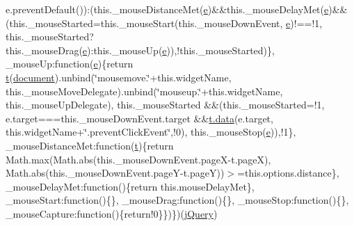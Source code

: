 \begin{DoxyCompactItemize}
e.\-prevent\-Default())\-:(this.\-\_\-mouse\-Distance\-Met(\hyperlink{static_2root_2js_2jquery-ui_8custom_8min_8js_abea95a4e94bc6f4151d5683d4c12c3f4}{e})\&\&this.\-\_\-mouse\-Delay\-Met(\hyperlink{static_2root_2js_2jquery-ui_8custom_8min_8js_abea95a4e94bc6f4151d5683d4c12c3f4}{e})\&\&(this.\-\_\-mouse\-Started=this.\-\_\-mouse\-Start(this.\-\_\-mouse\-Down\-Event, \hyperlink{static_2root_2js_2jquery-ui_8custom_8min_8js_abea95a4e94bc6f4151d5683d4c12c3f4}{e})!==!1, this.\-\_\-mouse\-Started?this.\-\_\-mouse\-Drag(\hyperlink{static_2root_2js_2jquery-ui_8custom_8min_8js_abea95a4e94bc6f4151d5683d4c12c3f4}{e})\-:this.\-\_\-mouse\-Up(\hyperlink{static_2root_2js_2jquery-ui_8custom_8min_8js_abea95a4e94bc6f4151d5683d4c12c3f4}{e})),!this.\-\_\-mouse\-Started)\}, \-\_\-mouse\-Up\-:function(\hyperlink{static_2root_2js_2jquery-ui_8custom_8min_8js_abea95a4e94bc6f4151d5683d4c12c3f4}{e})\{return \hyperlink{static_2root_2js_2bootstrap_2jquery-ui-1_810_84_8custom_8min_8js_acf335ef347969ef6dc8387e680fb289e}{t}(\hyperlink{static_2root_2js_2headroom_8min_8js_aa14f8e0338cced6720590fd2ea13bd4b}{document}).unbind(\char`\"{}mousemove.\char`\"{}+this.\-widget\-Name, this.\-\_\-mouse\-Move\-Delegate).unbind(\char`\"{}mouseup.\char`\"{}+this.\-widget\-Name, this.\-\_\-mouse\-Up\-Delegate), this.\-\_\-mouse\-Started \&\&(this.\-\_\-mouse\-Started=!1, e.\-target===this.\-\_\-mouse\-Down\-Event.\-target \&\&\hyperlink{jquery-migrate-1_82_81_8min_8js_a7f60fda3d1d4191e549df075eeacf25b}{t.\-data}(e.\-target, this.\-widget\-Name+\char`\"{}.prevent\-Click\-Event\char`\"{},!0), this.\-\_\-mouse\-Stop(\hyperlink{static_2root_2js_2jquery-ui_8custom_8min_8js_abea95a4e94bc6f4151d5683d4c12c3f4}{e})),!1\}, \-\_\-mouse\-Distance\-Met\-:function(\hyperlink{static_2root_2js_2bootstrap_2jquery-ui-1_810_84_8custom_8min_8js_acf335ef347969ef6dc8387e680fb289e}{t})\{return Math.\-max(Math.\-abs(this.\-\_\-mouse\-Down\-Event.\-page\-X-\/t.\-page\-X), Math.\-abs(this.\-\_\-mouse\-Down\-Event.\-page\-Y-\/t.\-page\-Y))$>$=this.\-options.\-distance\}, \-\_\-mouse\-Delay\-Met\-:function()\{return this.\-mouse\-Delay\-Met\}, \-\_\-mouse\-Start\-:function()\{\}, \-\_\-mouse\-Drag\-:function()\{\}, \-\_\-mouse\-Stop\-:function()\{\}, \-\_\-mouse\-Capture\-:function()\{return!0\}\})\})(\hyperlink{jquery_8js_a5e01048fbd3a30b44e8d491d8945c457}{j\-Query})
\item 

\end{DoxyCompactItemize}
